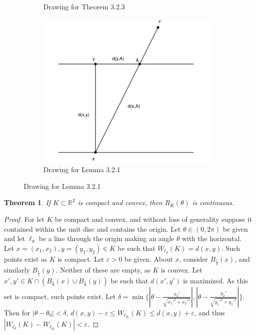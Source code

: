 \documentclass[12pt,oneside]{book}
\theoremstyle{mystyle}
\newtheorem{theorem}{Theorem}[section]
\begin{document}
\begin{figure}[H]
\begin{subfigure}[b]{0.32\textwidth}
    \caption{Drawing for Theorem 3.2.3}
  \end{subfigure}
  \begin{subfigure}[b]{0.32\textwidth}
    \centering
    \includegraphics[width=\textwidth]{line-1.png}
    \caption{Drawing for Lemma 3.2.1}
  \end{subfigure}  
\end{figure}

\begin{theorem}
If $K\subset \mathbb{R}^2$ is compact and convex, then $R_K(\theta)$ is continuous.
\end{theorem}
\begin{proof}
For let $K$ be compact and convex, and without loss of generality suppose it contained within the unit disc and contains the origin. Let $\theta\in (0,2\pi)$ be given and let $\ell_{\theta}$ be a line through the origin making an angle $\theta$ with the horizontal. Let $x=(x_1,x_2),y=(y_1,y_2)\in K$ be such that $W_{\ell_{\theta}}(K) = d(x,y)$. Such points exist as $K$ is compact. Let $\varepsilon>0$ be given. About $x$, consider $B_{\frac{\varepsilon}{2}}(x)$, and similarly $B_{\frac{\varepsilon}{2}}(y)$. Neither of these are empty, as $K$ is convex. Let $x',y'\in K\cap(B_{\frac{\varepsilon}{2}}(x)\cup B_{\frac{\varepsilon}{2}}(y))$ be such that $d(x',y')$ is maximized. As this set is compact, such points exist. Let $\delta = \min\{|\theta-\frac{x_2'}{\sqrt{x_1'^2+x_2'^2}}|,|\theta-\frac{y_2'}{\sqrt{y_1'^2+y_2'^2}}|\}$. Then for $|\theta-\theta_0|<\delta$, $d(x,y)-\varepsilon \leq W_{\ell_{\theta_0}}(K)\leq d(x,y)+\varepsilon$, and thus $|W_{\ell_\theta}(K)-W_{\ell_{\theta_0}}(K)| < \varepsilon$.
\end{proof}
\end{document}
